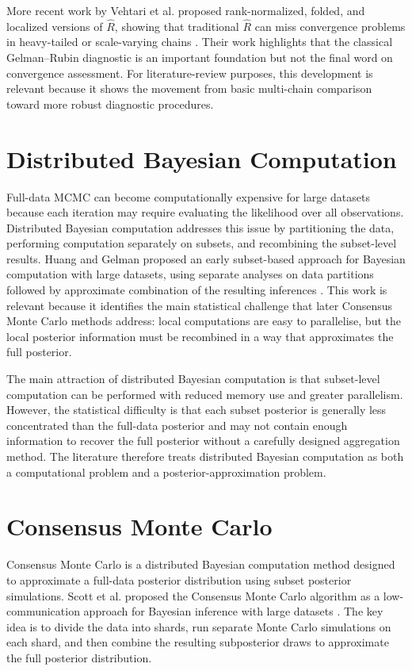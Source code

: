 More recent work by Vehtari et al. proposed rank-normalized, folded, and localized versions of $\hat{R}$, showing that traditional $\hat{R}$ can miss convergence problems in heavy-tailed or scale-varying chains \cite{vehtari2021rank}. Their work highlights that the classical Gelman--Rubin diagnostic is an important foundation but not the final word on convergence assessment. For literature-review purposes, this development is relevant because it shows the movement from basic multi-chain comparison toward more robust diagnostic procedures.

\section{Distributed Bayesian Computation}

Full-data MCMC can become computationally expensive for large datasets because each iteration may require evaluating the likelihood over all observations. Distributed Bayesian computation addresses this issue by partitioning the data, performing computation separately on subsets, and recombining the subset-level results. Huang and Gelman proposed an early subset-based approach for Bayesian computation with large datasets, using separate analyses on data partitions followed by approximate combination of the resulting inferences \cite{huang2005sampling}. This work is relevant because it identifies the main statistical challenge that later Consensus Monte Carlo methods address: local computations are easy to parallelise, but the local posterior information must be recombined in a way that approximates the full posterior.

The main attraction of distributed Bayesian computation is that subset-level computation can be performed with reduced memory use and greater parallelism. However, the statistical difficulty is that each subset posterior is generally less concentrated than the full-data posterior and may not contain enough information to recover the full posterior without a carefully designed aggregation method. The literature therefore treats distributed Bayesian computation as both a computational problem and a posterior-approximation problem.

\section{Consensus Monte Carlo}

Consensus Monte Carlo is a distributed Bayesian computation method designed to approximate a full-data posterior distribution using subset posterior simulations. Scott et al. proposed the Consensus Monte Carlo algorithm as a low-communication approach for Bayesian inference with large datasets \cite{scott2016bayes}. The key idea is to divide the data into shards, run separate Monte Carlo simulations on each shard, and then combine the resulting subposterior draws to approximate the full posterior distribution.

